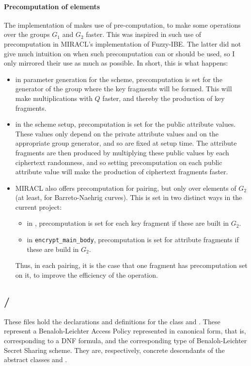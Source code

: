 \documentclass{article}
\begin{document}
\paragraph{Precomputation of elements}
The implementation of \cKPABE makes use of pre-computation, to make some operations over the groups $G_1$ and $G_2$ faster. This was inspired in such use of precomputation in MIRACL's implementation of Fuzzy-IBE. The latter did not give much intuition on when such precomputation can or should be used, so I only mirrored their use as much as possible. In short, this is what happens:
\begin{itemize}
\item in parameter generation for the scheme, precomputation is set for the generator of the group where the key fragments will be formed. This will make multiplications with $Q$ faster, and thereby the production of key fragments.
\item in the scheme setup, precomputation is set for the public attribute values. These values only depend on the private attribute values and on the appropriate group generator, and so are fixed at setup time. The attribute fragments are then produced by multiplying these public values by each ciphertext randomness, and so setting precomputation on each public attribute value will make the production of ciphertext fragments faster.
\item MIRACL also offers precomputation for pairing, but only over elements of $G_2$ (at least, for Barreto-Naehrig curves). This is set in two distinct ways in the current project:
\begin{itemize}
\item in , precomputation is set for each key fragment if these are built in $G_2$.
\item in \verb|encrypt_main_body|, precomputation is set for attribute fragments if these are build in $G_2$. 
\end{itemize}
Thus, in each pairing, it is the case that one fragment has precomputation set on it, to improve the efficiency of the operation.
\end{itemize}


\subsection{\fhblcanon / \fcblcanon}

These files hold the declarations and definitions for the class \cBLcanonAP and \cBLcanon. These represent a Benaloh-Leichter Access Policy represented in canonical form, that is, corresponding to a DNF formula, and the corresponding type of Benaloh-Leichter Secret Sharing scheme. They are, respectively, concrete descendants of the abstract classes \cAP and \cSS.
\end{document}
